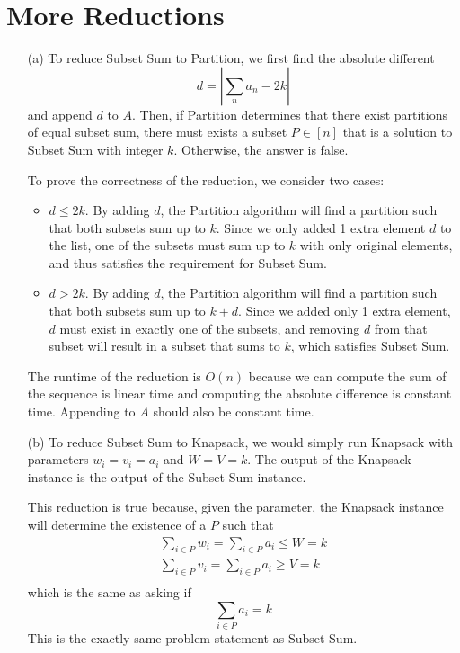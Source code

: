 \documentclass[11pt]{article}
\theoremstyle{definition}
\theoremstyle{remark}
\begin{document}
\section{More Reductions}
\begin{enumerate}
\item[(a)] To reduce Subset Sum to Partition, we first find the absolute different 
$$d = \left|\sum_n a_n - 2k\right|$$
and append $d$ to $A$. Then, if Partition determines that there exist partitions of equal subset sum, there must exists a subset $P\in [n]$ that is a solution to Subset Sum with integer $k$. Otherwise, the answer is false.

To prove the correctness of the reduction, we consider two cases:
\begin{itemize}
\item $d \leq 2k$. By adding $d$, the Partition algorithm will find a partition such that both subsets sum up to $k$. Since we only added 1 extra element $d$ to the list, one of the subsets must sum up to $k$ with only original elements, and thus satisfies the requirement for Subset Sum.

\item $d > 2k$. By adding $d$, the Partition algorithm will find a partition such that both subsets sum up to $k + d$. Since we added only 1 extra element, $d$ must exist in exactly one of the subsets, and removing $d$ from that subset will result in a subset that sums to $k$, which satisfies Subset Sum.
\end{itemize}

The runtime of the reduction is $O(n)$ because we can compute the sum of the sequence is linear time and computing the absolute difference is constant time. Appending to $A$ should also be constant time.

\item[(b)] To reduce Subset Sum to Knapsack, we would simply run Knapsack with parameters $w_i = v_i = a_i$ and $W = V = k$. The output of the Knapsack instance is the output of the Subset Sum instance.

This reduction is true because, given the parameter, the Knapsack instance will determine the existence of a $P$ such that
\begin{align*}
\sum_{i\in P} w_i = \sum_{i\in P} a_i \leq W = k \\
\sum_{i\in P} v_i = \sum_{i\in P} a_i \geq V = k \\
\end{align*}
which is the same as asking if
\[
\sum_{i\in P}a_i = k
\]
This is the exactly same problem statement as Subset Sum.


\end{enumerate}
\end{document}
